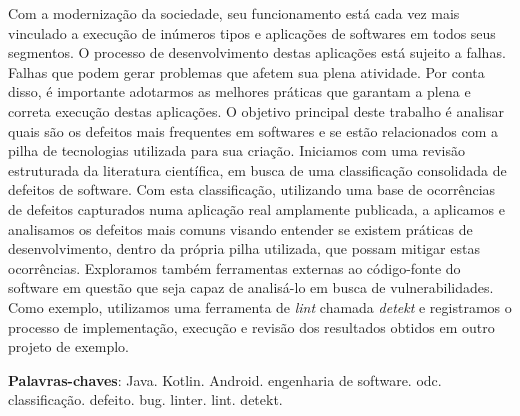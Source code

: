 
\begin{resumo}
Com a modernização da sociedade, seu funcionamento está cada vez mais vinculado a execução de inúmeros tipos e aplicações de softwares em todos seus segmentos. O processo de desenvolvimento destas aplicações está sujeito a falhas. Falhas que podem gerar problemas que afetem sua plena atividade. Por conta disso, é importante adotarmos as melhores práticas que garantam a plena e correta execução destas aplicações. O objetivo principal deste trabalho é analisar quais são os defeitos mais frequentes em softwares e se estão relacionados com a pilha de tecnologias utilizada para sua criação. Iniciamos com uma revisão estruturada da literatura científica, em busca de uma classificação consolidada de defeitos de software. Com esta classificação, utilizando uma base de ocorrências de defeitos capturados numa aplicação real amplamente publicada, a aplicamos e analisamos os defeitos mais comuns visando entender se existem práticas de desenvolvimento, dentro da própria pilha utilizada, que possam mitigar estas ocorrências. Exploramos também ferramentas externas ao código-fonte do software em questão que seja capaz de analisá-lo em busca de vulnerabilidades. Como exemplo, utilizamos uma ferramenta de \textit{lint} chamada \textit{detekt} e registramos o processo de implementação, execução e revisão dos resultados obtidos em outro projeto de exemplo.

\vspace{\onelineskip}
 
\noindent 
\textbf{Palavras-chaves}: Java. Kotlin. Android. engenharia de software. odc. classificação. defeito. bug. linter. lint. detekt.
\end{resumo}

